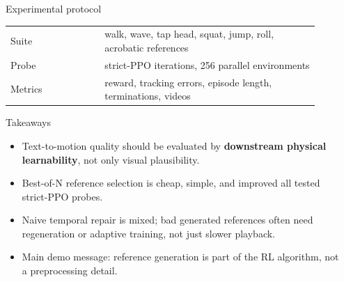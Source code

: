 \documentclass[final]{beamer}
\newlength{\sepwidth}
\newlength{\colwidth}
\newcommand{\separatorcolumn}{\begin{column}{\sepwidth}\end{column}}
\newcommand{\metric}[1]{\textbf{#1}}
\begin{document}
\begin{frame}[t]
\begin{columns}[t]
\begin{column}{\colwidth}
\begin{block}{Experimental protocol}
\small
\begin{tabular}{>{\raggedright\arraybackslash}p{0.28\linewidth} >{\raggedright\arraybackslash}p{0.64\linewidth}}
\toprule
Suite & walk, wave, tap head, squat, jump, roll, acrobatic references \\
Probe & 150 strict-PPO iterations, 256 parallel environments \\
Metrics & reward, tracking errors, episode length, terminations, videos \\
\bottomrule
\end{tabular}
\end{block}

\begin{alertblock}{Takeaways}
\small
\justifying
\begin{itemize}
  \item Text-to-motion quality should be evaluated by \metric{downstream physical learnability}, not only visual plausibility.
  \item Best-of-N reference selection is cheap, simple, and improved all tested strict-PPO probes.
  \item Naive temporal repair is mixed; bad generated references often need regeneration or adaptive training, not just slower playback.
  \item Main demo message: reference generation is part of the RL algorithm, not a preprocessing detail.
\end{itemize}
\end{alertblock}

\end{column}

\separatorcolumn
\end{columns}
\end{frame}
\end{document}
